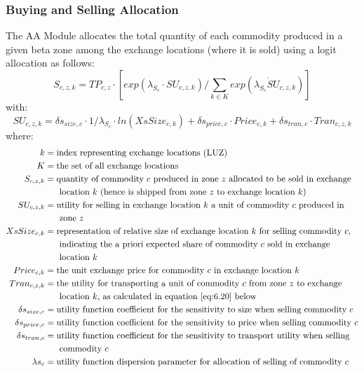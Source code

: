 \subsubsection{Buying and Selling Allocation}
The AA Module allocates the total quantity of each commodity produced in a given beta zone among the exchange locations (where it is sold) using a logit allocation as follows:
\begin{equation}\label{eq:6.12}
S_{c,z,k}  =  TP_{c,z} \cdot \left[ exp(\lambda_{S_c} \cdot SU_{c,z,k} ) / \sum_{k \in K} exp(\lambda_{S_c} \dot SU_{c,z,k}) \right]
\end{equation}
\noindent with:
\begin{equation}\label{eq:6.13}
SU_{c,z,k} = \delta s_{size,c} \cdot 1/\lambda_{S_c} \cdot ln(XsSize_{c,k}) + \delta s_{price,c} \cdot Price_{c,k} + \delta s_{tran,c} \cdot Tran_{c,z,k}
\end{equation}
\noindent where:
\begin{align*}
k &= \text{index representing exchange locations (LUZ)} \\
K &= \text{the set of all exchange locations} \\
S_{c,z,k} &= \text{quantity of commodity $c$ produced in zone $z$ allocated to be sold in exchange} \\
 &~~~~~\text{location $k$ (hence is shipped from zone $z$ to exchange location $k$)} \\
SU_{c,z,k} &= \text{utility for selling in exchange location $k$ a unit of commodity $c$ produced in} \\
 &~~~~~\text{zone $z$} \\
XsSize_{c,k} &= \text{representation of relative size of exchange location $k$ for selling commodity $c$,} \\
 &~~~~~\text{indicating the a priori expected share of commodity $c$ sold in exchange} \\
 &~~~~~\text{location $k$} \\
Price_{c,k} &= \text{the unit exchange price for commodity $c$ in exchange location $k$} \\ 
Tran_{c,z,k} &= \text{the utility for transporting a unit of commodity $c$ from zone $z$ to exchange} \\
 &~~~~~\text{location $k$, as calculated in equation \ref{eq:6.20} below} \\
\delta s_{size,c} &= \text{utility function coefficient for the sensitivity to size when selling commodity $c$} \\
\delta s_{price,c} &= \text{utility function coefficient for the sensitivity to price when selling commodity $c$} \\
\delta s_{tran,c} &= \text{utility function coefficient for the sensitivity to transport utility when selling} \\
 &~~~~~\text{commodity $c$} \\
\lambda s_c &= \text{utility function dispersion parameter for allocation of selling of commodity $c$}
\end{align*}

